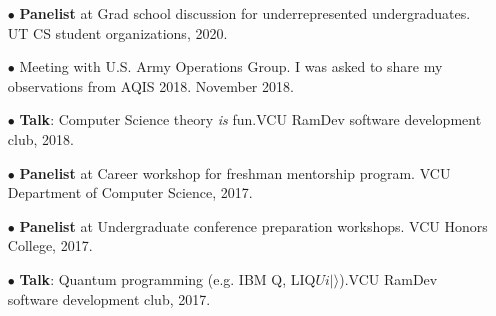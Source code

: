 \documentclass[11pt,letterpaper,serif]{moderncv}
\begin{document}
\begin{itemize}
	\item[$\bullet$] \textbf{Panelist} at Grad school discussion for underrepresented undergraduates. UT CS student organizations, 2020.
	\item[$\bullet$] Meeting with U.S. Army Operations Group. I was asked to share my observations from AQIS 2018. November 2018.
	\item[$\bullet$] \textbf{Talk}: Computer Science theory \emph{is} fun.\quad VCU RamDev software development club, 2018.
	\item[$\bullet$] \textbf{Panelist} at Career workshop for freshman mentorship program. VCU Department of Computer Science, 2017.
	\item[$\bullet$] \textbf{Panelist} at Undergraduate conference preparation workshops. VCU Honors College, 2017.
	\item[$\bullet$] \textbf{Talk}: Quantum programming (e.g. IBM Q, LIQ$Ui|\rangle$).\quad VCU RamDev software development club, 2017.
\end{itemize}
\end{document}
